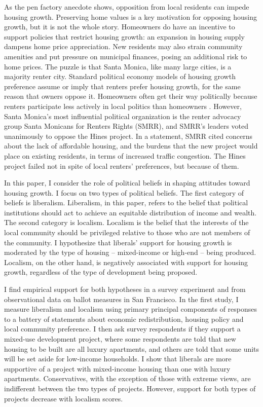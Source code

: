 \documentclass[article,11pt]{memoir}
\begin{document}
As the pen factory anecdote shows, opposition from local residents can impede housing growth.  Preserving home values is a key motivation for opposing housing growth, but it is not the whole story.  Homeowners do have an incentive to support policies that restrict housing growth: an expansion in housing supply dampens home price appreciation.  New residents may also strain community amenities and put pressure on municipal finances, posing an additional risk to home prices.  The puzzle is that Santa Monica, like many large cities, is a majority renter city.  Standard political economy models of housing growth preference assume or imply that renters prefer housing growth, for the same reason that owners oppose it.  Homeowners often get their way politically because renters participate less actively in local politics than homeowners \citep{oliver_local_2012}.  However, Santa Monica's most influential political organization is the renter advocacy group Santa Monicans for Renters Rights (SMRR), and  SMRR's leaders voted unanimously to oppose the Hines project.  In a statement, SMRR cited concerns about the lack of affordable housing, and the burdens that the new project would place on existing residents, in terms of increased traffic congestion. The Hines project failed not in spite of local renters' preferences, but because of them.

In this paper, I consider the role of political beliefs in shaping attitudes toward housing growth.  I focus on two types of political beliefs. The first category of beliefs is liberalism. Liberalism, in this paper, refers to the belief that political institutions should act to achieve an equitable distribution of income and wealth.  The second category is localism. Localism is the belief that the interests of the local community should be privileged relative to those who are not members of the community.  I hypothesize that liberals' support for housing growth is moderated by the type of housing -- mixed-income or high-end -- being produced.  Localism, on the other hand, is negatively associated with support for housing growth, regardless of the type of development being proposed.  

I find empirical support for both hypotheses in a survey experiment and from observational data on ballot measures in San Francisco. In the first study, I measure liberalism and localism using primary principal components of responses to a battery of statements about economic redistribution, housing policy and local community preference. I then ask survey respondents if they support a mixed-use development project, where some respondents are told that new housing to be built are all luxury apartments, and others are told that some units will be set aside for low-income households. I show that liberals are more supportive of a project with mixed-income housing than one with luxury apartments. Conservatives, with the exception of those with extreme views, are indifferent between the two types of projects.  However, support for both types of projects decrease with localism scores.
\end{document}
